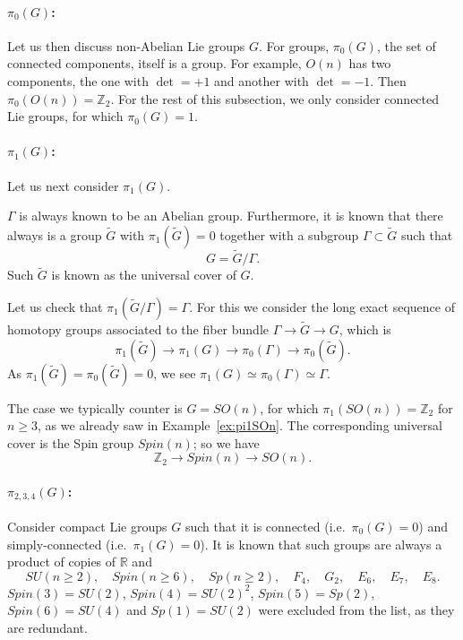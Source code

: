 \documentclass[12pt]{article}
\numberwithin{equation}{section}
\numberwithin{figure}{section}
\theoremstyle{remark}
\def\bR{\mathbb{R}}
\def\bZ{\mathbb{Z}}
\begin{document}
\paragraph{$\pi_0(G)$:}
Let us then discuss non-Abelian Lie groups $G$.
For groups, $\pi_0(G)$, the set of connected components, itself is a group.
For example, $O(n)$ has two components,
the one with $\det=+1$ and another with $\det=-1$.
Then $\pi_0(O(n))=\bZ_2$. 
For the rest of this subsection, we only consider connected Lie groups,
for which $\pi_0(G)=1$.

\paragraph{$\pi_1(G)$:}
Let us next consider $\pi_1(G)$. 
\begin{fact}
$\Gamma$ is always known to be an Abelian group.
Furthermore, it is known that there always is a group $\tilde G$ with $\pi_1(\tilde G)=0$
together with a subgroup $\Gamma \subset \tilde G$ such that \begin{equation}
G=\tilde G/\Gamma.
\end{equation}
Such $\tilde G$ is known as the universal cover of $G$.
\end{fact}
Let us check that $\pi_1(\tilde G/\Gamma)=\Gamma$.
For this we consider the long exact sequence of homotopy groups associated to 
the fiber bundle $\Gamma\to \tilde G\to G$, which is \begin{equation}
\pi_1(\tilde G)\to \pi_1(G)\to \pi_0(\Gamma)\to \pi_0(\tilde G).
\end{equation}
As $\pi_1(\tilde G)=\pi_0(\tilde G)=0$, we see $\pi_1(G)\simeq \pi_0(\Gamma)\simeq \Gamma$.

The case we typically counter is $G=SO(n)$, for which $\pi_1(SO(n))=\bZ_2$ for $n\ge 3$, as we already saw in Example~\ref{ex:pi1SOn}.
The corresponding universal cover is the Spin group $Spin(n)$;
so we have \begin{equation}
\bZ_2 \to Spin(n)\to SO(n).
\end{equation}

\paragraph{$\pi_{2,3,4}(G)$:}
Consider compact Lie groups $G$ such that 
it is connected (i.e.~$\pi_0(G)=0$)
and simply-connected (i.e.~$\pi_1(G)=0$).
It is known that such groups are always a product of copies of
$\bR$ and \begin{equation}
SU(n\ge 2),\quad
Spin(n\ge 6),\quad
Sp(n\ge 2),\quad
F_4,\quad
G_2,\quad
E_6,\quad
E_7,\quad
E_8.
\label{eq:list-simple-Lie}
\end{equation}
$Spin(3)=SU(2)$, $Spin(4)=SU(2)^2$, $Spin(5)=Sp(2)$, $Spin(6)=SU(4)$
 and $Sp(1)=SU(2)$ 
were excluded from the list, as they are redundant.
\end{document}

